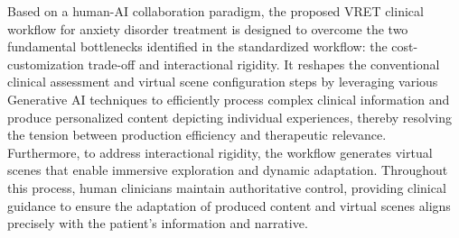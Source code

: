 \documentclass[]{interact}
\begin{document}
Based on a human-AI collaboration paradigm, the proposed VRET clinical workflow for anxiety disorder treatment is designed to overcome the two fundamental bottlenecks identified in the standardized workflow: the cost-customization trade-off and interactional rigidity.
It reshapes the conventional clinical assessment and virtual scene configuration steps by leveraging various Generative AI techniques to efficiently process complex clinical information and produce personalized content depicting individual experiences, thereby resolving the tension between production efficiency and therapeutic relevance.
Furthermore, to address interactional rigidity, the workflow generates virtual scenes that enable immersive exploration and dynamic adaptation.
Throughout this process, human clinicians maintain authoritative control, providing clinical guidance to ensure the adaptation of produced content and virtual scenes aligns precisely with the patient's information and narrative. 

%


%

%

\end{document}
